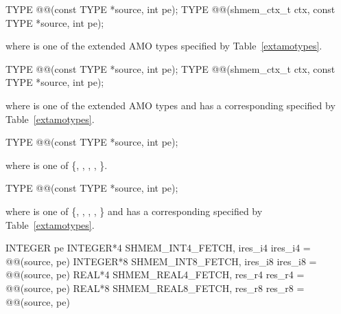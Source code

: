 
\begin{apidefinition}

\begin{C11synopsis}
TYPE @@(const TYPE *source, int pe);
TYPE @@(shmem_ctx_t ctx, const TYPE *source, int pe);
\end{C11synopsis}
where \TYPE{} is one of the extended \ac{AMO} types specified by
Table~\ref{extamotypes}.

\begin{Csynopsis}
TYPE @@(const TYPE *source, int pe);
TYPE @@(shmem_ctx_t ctx, const TYPE *source, int pe);
\end{Csynopsis}
where \TYPE{} is one of the extended \ac{AMO} types and has a corresponding
\TYPENAME{} specified by Table~\ref{extamotypes}.

\begin{DeprecateBlock}
\begin{C11synopsis}
TYPE @@(const TYPE *source, int pe);
\end{C11synopsis}
where \TYPE{} is one of \{, , ,
, \}.

\begin{Csynopsis}
TYPE @@(const TYPE *source, int pe);
\end{Csynopsis}
where \TYPE{} is one of \{, , ,
, \} and has a corresponding
\TYPENAME{} specified by Table~\ref{extamotypes}.
\end{DeprecateBlock}

\begin{Fsynopsis}
INTEGER pe
INTEGER*4 SHMEM_INT4_FETCH, ires_i4
ires\_i4 = @@(source, pe)
INTEGER*8 SHMEM_INT8_FETCH, ires_i8
ires\_i8 = @@(source, pe)
REAL*4 SHMEM_REAL4_FETCH, res_r4
res\_r4 = @@(source, pe)
REAL*8 SHMEM_REAL8_FETCH, res_r8
res\_r8 = @@(source, pe)
\end{Fsynopsis}

\begin{apiarguments}



\end{apiarguments}
\end{apidefinition}
